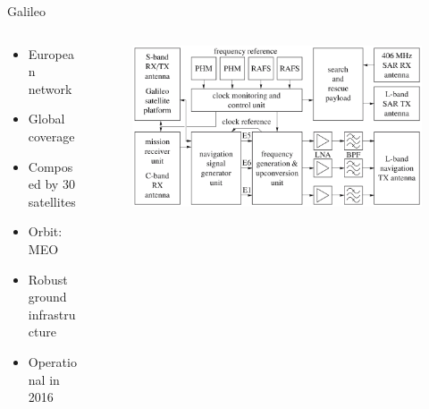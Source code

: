 \begin{frame}{Galileo}

    \begin{columns}[t]
        \begin{column}[t]{0.5\textwidth}
            \begin{itemize}
                \item European network
                \vspace{0.2cm}
                \item Global coverage
                \vspace{0.2cm}
                \item Composed by 30 satellites
                \vspace{0.2cm}
                \item Orbit: MEO
                \vspace{0.2cm}
                \item Robust ground infrastructure
                \vspace{0.2cm}
                \item Operational in 2016
            \end{itemize}
        \end{column}
        \begin{column}[t]{0.6\textwidth}
            \begin{figure}[!ht]
                \begin{center}
                    \includegraphics[width=0.9\columnwidth]{figures/galileo-satellite-bd}
                \end{center}
            \end{figure}


\end{column}
\end{columns}
\end{frame}
